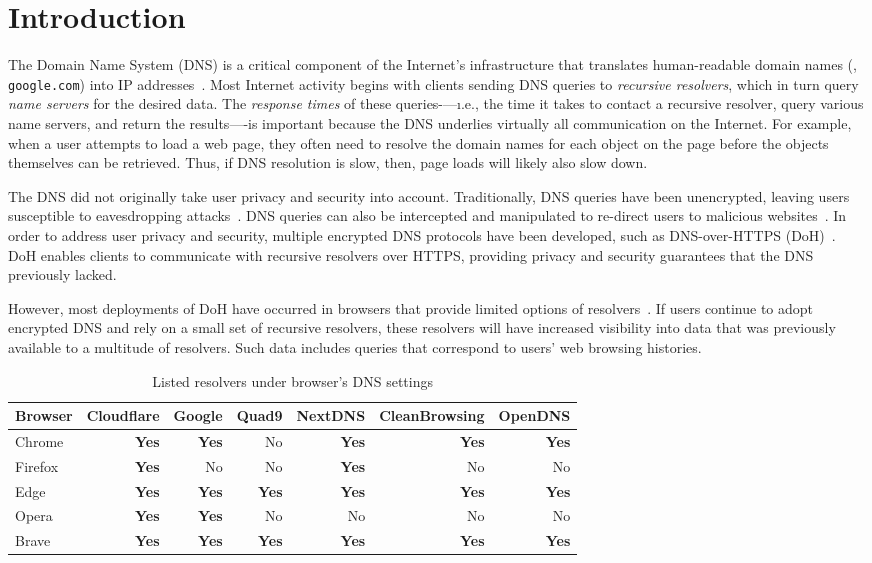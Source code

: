 \section{Introduction}\label{sec:intro}
The Domain Name System (DNS) is a critical component of the Internet's infrastructure that translates human-readable domain names (\eg, \texttt{google.com}) into IP addresses~\cite{dns-rfcs}.
Most Internet activity begins with clients sending DNS queries to \emph{recursive resolvers}, which in turn query \emph{name servers} for the desired data.
The \emph{response times} of these queries-—\i.e., the time it takes to contact a recursive resolver, query various name servers, and return the results—-is important because the DNS underlies virtually all communication on the Internet.
For example, when a user attempts to load a web page, they often need to resolve the domain names for each object on the page before the objects themselves can be retrieved.
Thus, if DNS resolution is slow, then, page loads will likely also slow down.

The DNS did not originally take user privacy and security into account.
Traditionally, DNS queries have been unencrypted, leaving users susceptible to eavesdropping attacks~\cite{dns-eavesdrop}.
DNS queries can also be intercepted and manipulated to re-direct users to malicious websites~\cite{dns-redirect}.
In order to address user privacy and security, multiple encrypted DNS protocols have been developed, such as DNS-over-HTTPS (DoH)~\cite{rfc8484}.
DoH enables clients to communicate with recursive resolvers over HTTPS, providing privacy and security guarantees that the DNS previously lacked.

However, most deployments of DoH have occurred in browsers that provide limited options of resolvers~\cite{9,6}.
If users continue to adopt encrypted DNS and rely on a small set of recursive resolvers, these resolvers will have increased visibility into data that was previously available to a multitude of resolvers.
Such data includes queries that correspond to users' web browsing histories.

\begin{table}
    \centering
    \begin{tabular}{lrrrrrr}
    \hline
    Browser & Cloudflare & Google & Quad9 & NextDNS & CleanBrowsing & OpenDNS
    \\
    \midrule
    Chrome    & \textbf{Yes} & \textbf{Yes} & No & \textbf{Yes} & \textbf{Yes} & \textbf{Yes} \\
    Firefox  & \textbf{Yes} & No & No & \textbf{Yes} & No & No \\ 
    Edge   & \textbf{Yes} & \textbf{Yes} & \textbf{Yes} & \textbf{Yes} & \textbf{Yes} & \textbf{Yes} \\
    Opera            & \textbf{Yes} & \textbf{Yes} & No & No & No & No \\
    Brave            & \textbf{Yes} & \textbf{Yes} & \textbf{Yes} & \textbf{Yes} & \textbf{Yes} & \textbf{Yes} \\
    \bottomrule
    \end{tabular}
    \caption{Listed resolvers under browser's DNS settings}
    \label{tab:SupportedResolvers}
\end{table}

